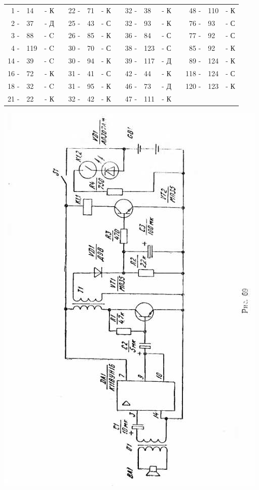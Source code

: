 \documentclass[12pt]{article}
\begin{document}
\hrulefill

\begin{tabular}{r l r p{0.5cm} r l r p{0.5cm} r l r p{0.5cm} r l r}
 1 - &  14 & - К &   & 22 - &  71 & - К &   &  32 - &  38 & - К &   &  48 - & 110  & - К\\
 2 - &  37 & - Д &   & 25 - &  43 & - С &   &  32 - &  93 & - К &   &  76 - &  93  & - С\\
 3 - &  88 & - C &   & 26 - &  85 & - К &   &  36 - &  84 & - С &   &  77 - &  92  & - С\\
 4 - & 119 & - C &   & 30 - &  70 & - С &   &  38 - & 123 & - С &   &  85 - &  92  & - К\\
14 - &  39 & - C &   & 30 - &  94 & - К &   &  39 - & 117 & - Д &   &  89 - & 124  & - К\\
16 - &  72 & - К &   & 31 - &  41 & - С &   &  42 - &  44 & - К &   & 118 - & 124  & - С\\
18 - &  32 & - C &   & 31 - &  95 & - К &   &  46 - &  73 & - Д &   & 120 - & 123  & - К\\
21 - &  22 & - К &   & 32 - &  42 & - К &   &  47 - & 111 & - К &   &       &      &    \\
\end{tabular}

\hrulefill

\newpage

\includegraphics[scale=1, angle=0]{ekon3_069_1}
\end{document}
